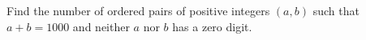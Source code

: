 Find the number of ordered pairs of positive integers $(a,b)$ such that $a+b=1000$ and neither $a$ nor $b$ has a zero digit.